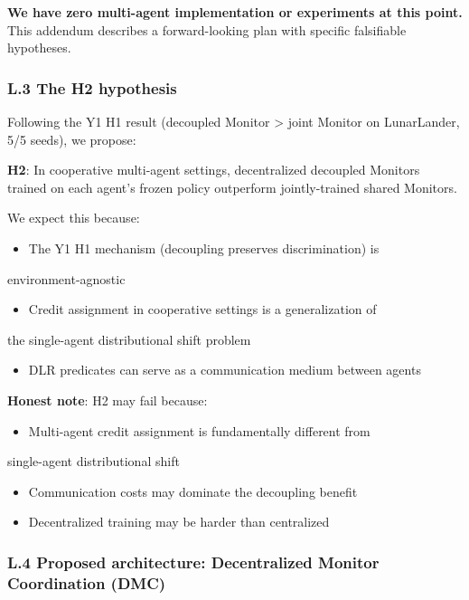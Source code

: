 \documentclass[11pt]{article}
\begin{document}
\textbf{We have zero multi-agent implementation or experiments at this point.}
This addendum describes a forward-looking plan with specific falsifiable
hypotheses.

\subsubsection{L.3 The H2 hypothesis}

Following the Y1 H1 result (decoupled Monitor > joint Monitor on
LunarLander, 5/5 seeds), we propose:

\textbf{H2}: In cooperative multi-agent settings, decentralized decoupled
Monitors trained on each agent's frozen policy outperform jointly-trained
shared Monitors.

We expect this because:
\begin{itemize}
  \item The Y1 H1 mechanism (decoupling preserves discrimination) is
\end{itemize}

  environment-agnostic
\begin{itemize}
  \item Credit assignment in cooperative settings is a generalization of
\end{itemize}

  the single-agent distributional shift problem
\begin{itemize}
  \item DLR predicates can serve as a communication medium between agents
\end{itemize}


\textbf{Honest note}: H2 may fail because:
\begin{itemize}
  \item Multi-agent credit assignment is fundamentally different from
\end{itemize}

  single-agent distributional shift
\begin{itemize}
  \item Communication costs may dominate the decoupling benefit
  \item Decentralized training may be harder than centralized
\end{itemize}


\subsubsection{L.4 Proposed architecture: Decentralized Monitor Coordination (DMC)}
\end{document}
